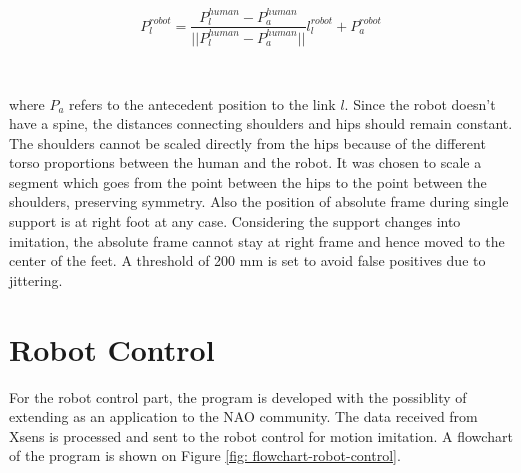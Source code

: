 \begin{equation}
    P_l^{robot} = \frac{P_l^{human} - P_a^{human}}{||P_l^{human} - P_a^{human}||}l_l^{robot} + P_a^{robot}
\end{equation}

~

where $P_a$ refers to the antecedent position to the link $l$. Since the robot doesn’t have a spine, the distances connecting shoulders and hips 
should remain constant. The shoulders cannot be scaled directly from the hips because of the different torso proportions between the human and the 
robot. It was chosen to scale a segment which goes from the point between the hips to the point between the shoulders, preserving symmetry. Also the 
position of absolute frame during single support is at right foot at any case. Considering the support changes into imitation, the absolute frame 
cannot stay at right frame and hence moved to the center of the feet. A threshold of 200 mm is set to avoid false positives due to jittering.

\section{Robot Control}

For the robot control part, the program is developed with the possiblity of extending as an application to the NAO community. The data received from 
Xsens is processed and sent to the robot control for motion imitation. 
A flowchart of the program is shown on Figure \ref{fig: flowchart-robot-control}.

